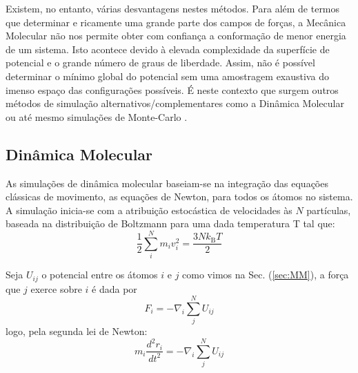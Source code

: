 \documentclass[12pt,a4paper]{article}
\begin{document}
	Existem, no entanto, várias desvantagens nestes métodos. Para além de termos que determinar e
	ricamente uma grande parte dos campos de forças, a Mecânica Molecular não nos permite obter com confiança a conformação de menor energia de um sistema. Isto acontece devido à elevada complexidade da superfície de potencial e o grande número de graus de liberdade. Assim, não é possível determinar o mínimo global do potencial sem uma amostragem exaustiva do imenso espaço das configurações possíveis. %
	É neste contexto que surgem outros métodos de simulação alternativos/complementares como a Dinâmica Molecular \cite{cheathamMolecularModelingNucleic2001,galindo-murilloMolecularModelingNucleic2014} ou até mesmo simulações de Monte-Carlo \cite{tenekedjievApplicationsMonteCarlo2011}.
	
\subsection{Dinâmica Molecular}
	As simulações de dinâmica molecular baseiam-se na integração das equações clássicas de movimento, as equações de Newton, para todos os átomos no sistema. A simulação inicia-se com a atribuição estocástica de velocidades às $N$ partículas, baseada na distribuição de Boltzmann para uma dada temperatura T tal que:
	\begin{equation}
		\frac{1}{2} \sum_{i}^{N} m_{i} v_{i}^{2}=\frac{3 N k_{\mathrm{B}} T}{2}
	\end{equation}
	
	Seja $U_{ij}$ o potencial entre os átomos $i$ e $j$ como vimos na Sec. (\ref{sec:MM}), a força que $j$ exerce sobre $i$ é dada por
	\begin{equation}
		F_i=-\nabla_{i} \sum_{j}^{N} U_{i j}
	\end{equation}
	logo, pela segunda lei de Newton:
	\begin{equation}
		m_{i} \frac{d^{2} r_{i}}{d t^{2}}=-\nabla_{i} \sum_{j}^{N} U_{i j}
		\label{eq:DM:segundaNewton}
	\end{equation}
\end{document}
